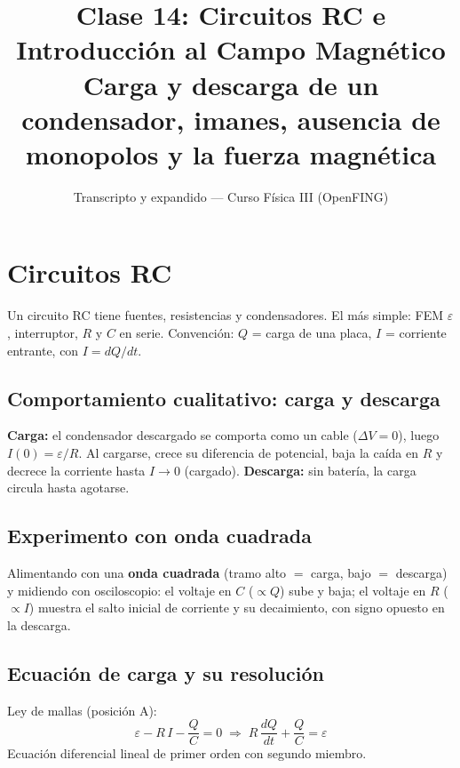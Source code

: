 \documentclass[12pt,a4paper]{article}
\title{\textbf{Clase 14: Circuitos RC e Introducción al Campo Magnético}\\[0.3em]
        \large{Carga y descarga de un condensador, imanes, ausencia de
              monopolos y la fuerza magnética}}
\author{Transcripto y expandido --- Curso Física III (OpenFING)}
\date{}
\begin{document}
\maketitle
\thispagestyle{empty}
\newpage

\tableofcontents
\newpage

\section{Circuitos RC}

Un circuito RC tiene fuentes, resistencias y condensadores. El más
simple: FEM $\varepsilon$, interruptor, $R$ y $C$ en serie. Convención:
$Q$ = carga de una placa, $I$ = corriente entrante, con $I = dQ/dt$.



\subsection{Comportamiento cualitativo: carga y descarga}

\textbf{Carga:} el condensador descargado se comporta como un cable
($\Delta V=0$), luego $I(0) = \varepsilon/R$. Al cargarse, crece su
diferencia de potencial, baja la caída en $R$ y decrece la corriente
hasta $I\to 0$ (cargado). \textbf{Descarga:} sin batería, la carga
circula hasta agotarse.

\subsection{Experimento con onda cuadrada}

Alimentando con una \textbf{onda cuadrada} (tramo alto $=$ carga, bajo
$=$ descarga) y midiendo con osciloscopio: el voltaje en $C$ ($\propto
Q$) sube y baja; el voltaje en $R$ ($\propto I$) muestra el salto inicial
de corriente y su decaimiento, con signo opuesto en la descarga.

\subsection{Ecuación de carga y su resolución}

Ley de mallas (posición A):
\[
\varepsilon - R\,I - \frac{Q}{C} = 0
\;\Longrightarrow\;
\boxed{R\,\frac{dQ}{dt} + \frac{Q}{C} = \varepsilon}
\]
Ecuación diferencial lineal de primer orden con segundo miembro.
\end{document}
